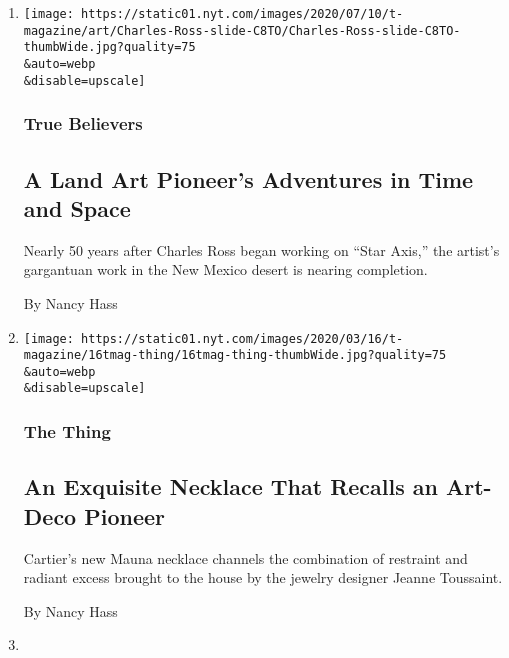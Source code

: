 \begin{enumerate}
\def\labelenumi{\arabic{enumi}.}
\item
  \href{/2020/07/21/t-magazine/charles-ross-artist.html}{}

  \texttt{[image: https://static01.nyt.com/images/2020/07/10/t-magazine/art/Charles-Ross-slide-C8TO/Charles-Ross-slide-C8TO-thumbWide.jpg?quality=75\\\&auto=webp\\\&disable=upscale]}

  \hypertarget{true-believers}{%
  \subsubsection{True Believers}\label{true-believers}}

  \hypertarget{a-land-art-pioneers-adventures-in-time-and-space}{%
  \subsection{A Land Art Pioneer's Adventures in Time and
  Space}\label{a-land-art-pioneers-adventures-in-time-and-space}}

  Nearly 50 years after Charles Ross began working on ``Star Axis,'' the
  artist's gargantuan work in the New Mexico desert is nearing
  completion.

  By Nancy Hass
\item
  \href{/2020/03/16/t-magazine/cartier-mauna-necklace.html}{}

  \texttt{[image: https://static01.nyt.com/images/2020/03/16/t-magazine/16tmag-thing/16tmag-thing-thumbWide.jpg?quality=75\\\&auto=webp\\\&disable=upscale]}

  \hypertarget{the-thing}{%
  \subsubsection{The Thing}\label{the-thing}}

  \hypertarget{an-exquisite-necklace-that-recalls-an-art-deco-pioneer}{%
  \subsection{An Exquisite Necklace That Recalls an Art-Deco
  Pioneer}\label{an-exquisite-necklace-that-recalls-an-art-deco-pioneer}}

  Cartier's new Mauna necklace channels the combination of restraint and
  radiant excess brought to the house by the jewelry designer Jeanne
  Toussaint.

  By Nancy Hass
\item
  \href{/2020/03/11/t-magazine/rem-koolhaas-pierre-paulin.html}{}


\end{enumerate}
